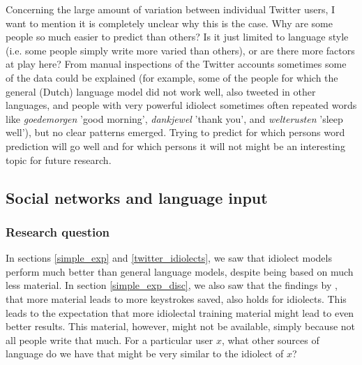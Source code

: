 \documentclass[12pt]{article}
\begin{document}
Concerning the large amount of variation between individual Twitter users, I want to mention it is completely unclear why this is the case. Why are some people so much easier to predict than others? Is it just limited to language style (i.e. some people simply write more varied than others), or are there more factors at play here? From manual inspections of the Twitter accounts sometimes some of the data could be explained (for example, some of the people for which the general (Dutch) language model did not work well, also tweeted in other languages, and people with very powerful idiolect sometimes often repeated words like \emph{goedemorgen} 'good morning', \emph{dankjewel} 'thank you', and \emph{welterusten} 'sleep well'), but no clear patterns emerged. Trying to predict for which persons word prediction will go well and for which persons it will not might be an interesting topic for future research.

\subsection{Social networks and language input} \label{input_networks}

\subsubsection{Research question}
In sections \ref{simple_exp} and \ref{twitter_idiolects}, we saw that idiolect models perform much better than general language models, despite being based on much less material. In section \ref{simple_exp_disc}, we also saw that the findings by , that more material leads to more keystrokes saved, also holds for idiolects. This leads to the expectation that more idiolectal training material might lead to even better results. This material, however, might not be available, simply because not all people write that much. For a particular user $x$, what other sources of language do we have that might be very similar to the idiolect of $x$?
\end{document}
